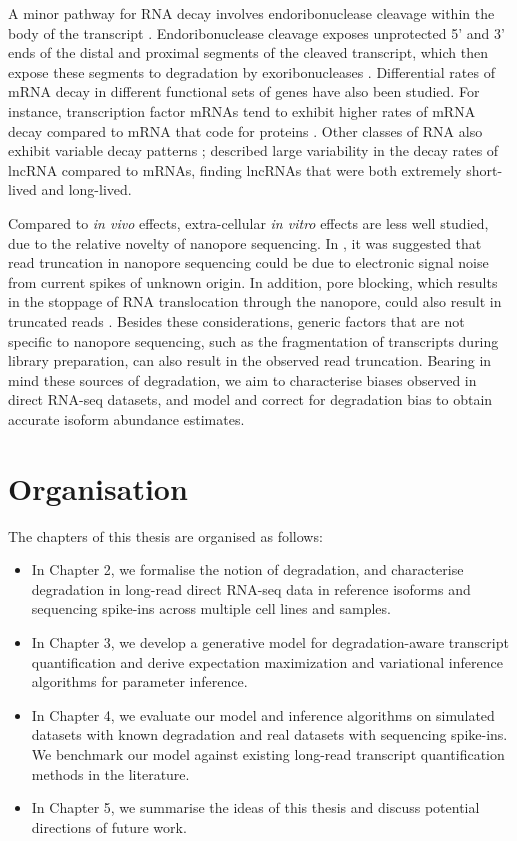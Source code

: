 A minor pathway for RNA decay involves endoribonuclease cleavage within the body of the transcript \cite{Garneau2007}. Endoribonuclease cleavage exposes unprotected 5’ and 3’ ends of the distal and proximal segments of the cleaved transcript, which then expose these segments to degradation by exoribonucleases \cite{ Gatfield2004,Garneau2007}. Differential rates of mRNA decay in different functional sets of genes have also been studied. For instance, transcription factor mRNAs tend to exhibit higher rates of mRNA decay compared to mRNA that code for proteins \cite{Yang2003}. Other classes of RNA also exhibit variable decay patterns \cite{Keene2010}; \cite{Kaiwan2021} described large variability in the decay rates of lncRNA compared to mRNAs, finding lncRNAs that were both extremely short-lived and long-lived. 

Compared to \textit{in vivo} effects, extra-cellular \textit{in vitro} effects are less well studied, due to the relative novelty of nanopore sequencing. In \cite{Workman2019}, it was suggested that read truncation in nanopore sequencing could be due to electronic signal noise from current spikes of unknown origin. In addition, pore blocking, which results in the stoppage of RNA translocation through the nanopore, could also result in truncated reads \cite{Amarasinghe2020}. Besides these considerations, generic factors that are not specific to nanopore sequencing, such as the fragmentation of transcripts during library preparation, can also result in the observed read truncation. Bearing in mind these sources of degradation, we aim to characterise biases observed in direct RNA-seq datasets, and model and correct for degradation bias to obtain accurate isoform abundance estimates. 

\section{Organisation}

The chapters of this thesis are organised as follows:
\begin{itemize}
    \item In Chapter 2, we formalise the notion of degradation, and characterise degradation in long-read direct RNA-seq data in reference isoforms and sequencing spike-ins across multiple cell lines and samples. 
    \item In Chapter 3, we develop a generative model for degradation-aware transcript quantification and derive expectation maximization and variational inference algorithms for parameter inference. 
    \item In Chapter 4, we evaluate our model and inference algorithms on simulated datasets with known degradation and real datasets with sequencing spike-ins. We benchmark our model against existing long-read transcript quantification methods in the literature. 
    \item In Chapter 5, we summarise the ideas of this thesis and discuss potential directions of future work. 
\end{itemize}